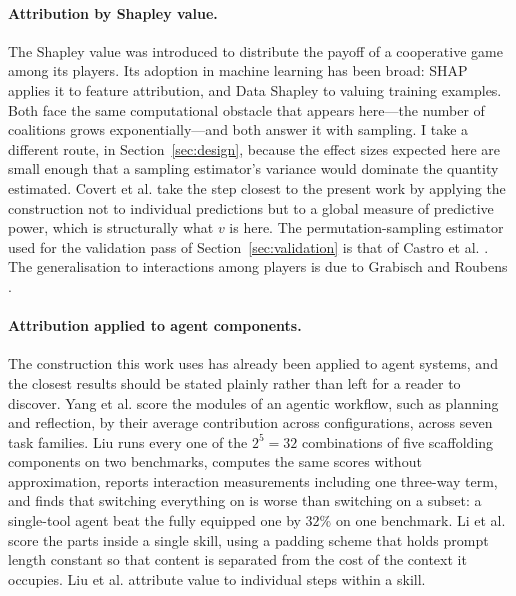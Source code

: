 \documentclass[11pt]{article}
\theoremstyle{plain}
\theoremstyle{definition}
\theoremstyle{remark}
\begin{document}
\paragraph{Attribution by Shapley value.} The Shapley value \cite{shapley} was introduced to distribute the payoff of a cooperative game among its players. Its adoption in machine learning has been broad: SHAP \cite{shap} applies it to feature attribution, and Data Shapley \cite{datashapley} to valuing training examples. Both face the same computational obstacle that appears here---the number of coalitions grows exponentially---and both answer it with sampling. I take a different route, in Section~\ref{sec:design}, because the effect sizes expected here are small enough that a sampling estimator's variance would dominate the quantity estimated. Covert et al. \cite{sage} take the step closest to the present work by applying the construction not to individual predictions but to a global measure of predictive power, which is structurally what $v$ is here. The permutation-sampling estimator used for the validation pass of Section~\ref{sec:validation} is that of Castro et al. \cite{castro}. The generalisation to interactions among players is due to Grabisch and Roubens \cite{grabisch}.

\paragraph{Attribution applied to agent components.} The construction this work uses has already been applied to agent systems, and the closest results should be stated plainly rather than left for a reader to discover. Yang et al. \cite{shapleyflow} score the modules of an agentic workflow, such as planning and reflection, by their average contribution across configurations, across seven task families. Liu \cite{mliu} runs every one of the $2^5 = 32$ combinations of five scaffolding components on two benchmarks, computes the same scores without approximation, reports interaction measurements including one three-way term, and finds that switching everything on is worse than switching on a subset: a single-tool agent beat the fully equipped one by $32\%$ on one benchmark. Li et al. \cite{skillsv} score the parts inside a single skill, using a padding scheme that holds prompt length constant so that content is separated from the cost of the context it occupies. Liu et al. \cite{skillshapley} attribute value to individual steps within a skill.
\end{document}

